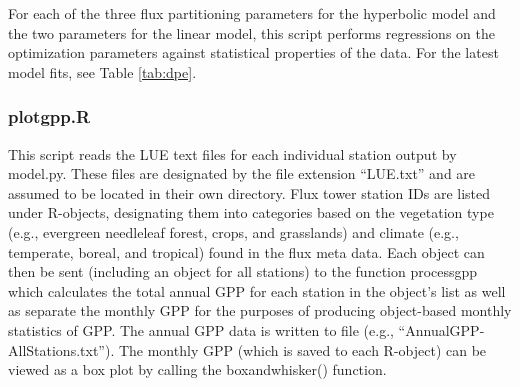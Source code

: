 For each of the three flux partitioning parameters for the hyperbolic model and the two parameters for the linear model, this script performs regressions on the optimization parameters against statistical properties of the data.  
For the latest model fits, see Table \ref{tab:dpe}.

\subsubsection{plot\textunderscore gpp.R}
\label{sec:modelpgr}
This script reads the LUE text files for each individual station output by model.py.  
These files are designated by the file extension ``\textunderscore LUE.txt'' and are assumed to be located in their own directory.  
Flux tower station IDs are listed under R-objects, designating them into categories based on the vegetation type (e.g., evergreen needleleaf forest, crops, and grasslands) and climate (e.g., temperate, boreal, and tropical) found in the flux meta data. 
Each object can then be sent (including an object for all stations) to the function process\textunderscore gpp which calculates the total annual GPP for each station in the object's list as well as separate the monthly GPP for the purposes of producing object-based monthly statistics of GPP.  
The annual GPP data is written to file (e.g., ``Annual\textunderscore GPP-All\textunderscore Stations.txt'').  The monthly GPP (which is saved to each R-object) can be viewed as a box plot by calling the box\textunderscore and\textunderscore whisker() function.  

